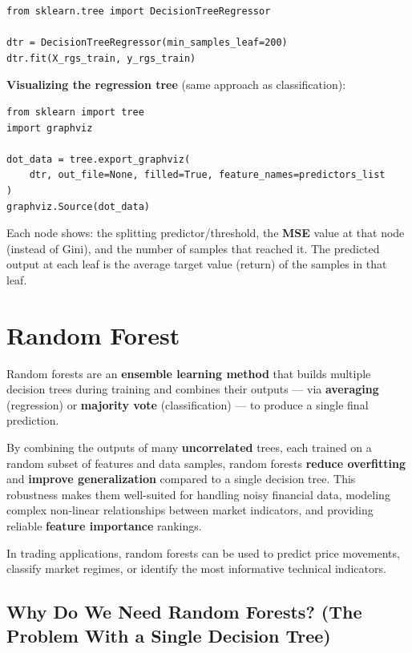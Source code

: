 \documentclass[12pt,openany]{book}
\begin{document}
\begin{Verbatim}[breaklines=true,fontsize=\small]
from sklearn.tree import DecisionTreeRegressor

dtr = DecisionTreeRegressor(min_samples_leaf=200)
dtr.fit(X_rgs_train, y_rgs_train)
\end{Verbatim}


\textbf{Visualizing the regression tree} (same approach as classification):

\begin{Verbatim}[breaklines=true,fontsize=\small]
from sklearn import tree
import graphviz

dot_data = tree.export_graphviz(
    dtr, out_file=None, filled=True, feature_names=predictors_list
)
graphviz.Source(dot_data)
\end{Verbatim}


Each node shows: the splitting predictor/threshold, the \textbf{MSE} value at that node (instead of Gini), and the number of samples that reached it. The predicted output at each leaf is the average target value (return) of the samples in that leaf.


\section{Random Forest}

Random forests are an \textbf{ensemble learning method} that builds multiple decision trees during training and combines their outputs --- via \textbf{averaging} (regression) or \textbf{majority vote} (classification) --- to produce a single final prediction.

By combining the outputs of many \textbf{uncorrelated} trees, each trained on a random subset of features and data samples, random forests \textbf{reduce overfitting} and \textbf{improve generalization} compared to a single decision tree. This robustness makes them well-suited for handling noisy financial data, modeling complex non-linear relationships between market indicators, and providing reliable \textbf{feature importance} rankings.

In trading applications, random forests can be used to predict price movements, classify market regimes, or identify the most informative technical indicators.

\medskip


\subsection{Why Do We Need Random Forests? (The Problem With a Single Decision Tree)}
\end{document}
